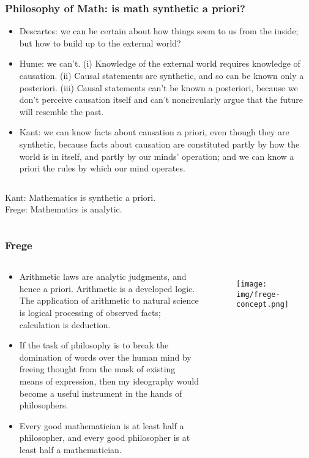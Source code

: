 \documentclass[UTF8,11pt,colorlinks,compress,openany]{beamer}%
\begin{document}
\begin{frame}\frametitle{Philosophy of Math: is math synthetic a priori?}
\begin{itemize}
	\item Descartes: we can be certain about how things seem to us from the inside; but how to build up to the external world?
	\item Hume: we can't. (i) Knowledge of the external world requires knowledge of causation. (ii) Causal statements are synthetic, and so can be known only a posteriori. (iii) Causal statements can't be known a posteriori, because we don't perceive causation itself and can't noncircularly argue that the future will resemble the past.
	\item Kant: we can know facts about causation a priori, even though they are synthetic, because facts about causation are constituted partly by how the world is in itself, and partly by our minds' operation; and we can know a priori the rules by which our mind operates.
\end{itemize}
\begin{columns}
Kant: Mathematics is synthetic a priori.\\
Frege: Mathematics is analytic.
\end{columns}
\end{frame}

\begin{frame}\frametitle{Frege}
\begin{columns}
\begin{block}{}
	\begin{itemize}
		\item Arithmetic laws are analytic judgments, and hence a priori. Arithmetic is a developed logic. The application of arithmetic to natural science is logical processing of observed facts; calculation is deduction.
		\item If the task of philosophy is to break the domination of words over the human mind by freeing thought from the mask of existing means of expression, then my ideography would become a useful instrument in the hands of philosophers.
		\item Every good mathematician is at least half a philosopher, and every good philosopher is at least half a mathematician.
	\end{itemize}
\end{block}
\begin{figure}[H]
\texttt{[image: img/frege-concept.png]}
\end{figure}
\end{columns}
\end{frame}
\end{document}
